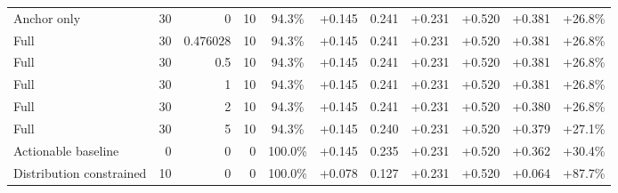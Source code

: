 \begin{table}[htbp]
\begin{tabular}{lrrrccccccc}
Anchor only & 30 & 0 & 10 & 94.3\% & +0.145 & 0.241 & +0.231 & +0.520 & +0.381 & +26.8\% \\
Full & 30 & 0.476028 & 10 & 94.3\% & +0.145 & 0.241 & +0.231 & +0.520 & +0.381 & +26.8\% \\
Full & 30 & 0.5 & 10 & 94.3\% & +0.145 & 0.241 & +0.231 & +0.520 & +0.381 & +26.8\% \\
Full & 30 & 1 & 10 & 94.3\% & +0.145 & 0.241 & +0.231 & +0.520 & +0.381 & +26.8\% \\
Full & 30 & 2 & 10 & 94.3\% & +0.145 & 0.241 & +0.231 & +0.520 & +0.380 & +26.8\% \\
Full & 30 & 5 & 10 & 94.3\% & +0.145 & 0.240 & +0.231 & +0.520 & +0.379 & +27.1\% \\
Actionable baseline & 0 & 0 & 0 & 100.0\% & +0.145 & 0.235 & +0.231 & +0.520 & +0.362 & +30.4\% \\
Distribution constrained & 10 & 0 & 0 & 100.0\% & +0.078 & 0.127 & +0.231 & +0.520 & +0.064 & +87.7\% \\
\bottomrule
\end{tabular}
\end{table}